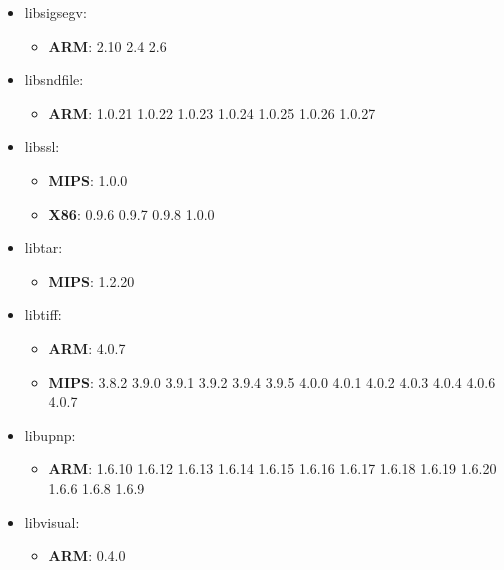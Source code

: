 \documentclass[twocolumn,a4paper]{IEEEtran} %
\begin{document}
\begin{itemize}[noitemsep,topsep=0pt,parsep=0pt,partopsep=0pt]
\item libsigsegv:
\begin{itemize}[noitemsep,topsep=0pt,parsep=0pt,partopsep=0pt]
  \item \textbf{ARM}: 2.10 2.4 2.6
\end{itemize}

\item libsndfile:
\begin{itemize}[noitemsep,topsep=0pt,parsep=0pt,partopsep=0pt]
  \item \textbf{ARM}: 1.0.21 1.0.22 1.0.23 1.0.24 1.0.25 1.0.26 1.0.27
\end{itemize}

\item libssl:
\begin{itemize}[noitemsep,topsep=0pt,parsep=0pt,partopsep=0pt]
  \item \textbf{MIPS}: 1.0.0
  \item \textbf{X86}: 0.9.6 0.9.7 0.9.8 1.0.0
\end{itemize}

\item libtar:
\begin{itemize}[noitemsep,topsep=0pt,parsep=0pt,partopsep=0pt]
  \item \textbf{MIPS}: 1.2.20
\end{itemize}

\item libtiff:
\begin{itemize}[noitemsep,topsep=0pt,parsep=0pt,partopsep=0pt]
  \item \textbf{ARM}: 4.0.7
  \item \textbf{MIPS}: 3.8.2 3.9.0 3.9.1 3.9.2 3.9.4 3.9.5 4.0.0 4.0.1 4.0.2 4.0.3 4.0.4 4.0.6 4.0.7
\end{itemize}

\item libupnp:
\begin{itemize}[noitemsep,topsep=0pt,parsep=0pt,partopsep=0pt]
  \item \textbf{ARM}: 1.6.10 1.6.12 1.6.13 1.6.14 1.6.15 1.6.16 1.6.17 1.6.18 1.6.19 1.6.20 1.6.6 1.6.8 1.6.9
\end{itemize}

\item libvisual:
\begin{itemize}[noitemsep,topsep=0pt,parsep=0pt,partopsep=0pt]
  \item \textbf{ARM}: 0.4.0
\end{itemize}


\end{itemize}
\end{document}
